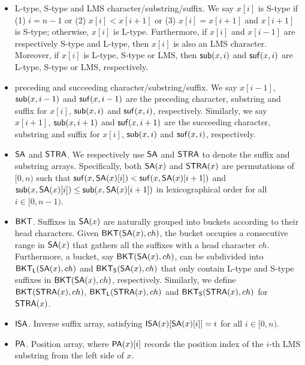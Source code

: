 \documentclass[10pt,journal,compsoc]{IEEEtran}
\begin{document}
\begin{itemize}[itemindent = 0ex]
	\item L-type, S-type and LMS character/substring/suffix. We say $x[i]$ is S-type if (1) $i = n - 1$ or (2) $x[i] < x[i + 1]$ or (3) $x[i] = x[i+1]$ and $x[i+1]$ is S-type; otherwise, $x[i]$ is L-type. Furthermore, if $x[i]$ and $x[i - 1]$ are respectively S-type and L-type, then $x[i]$ is also an LMS character. Moreover, if $x[i]$ is L-type, S-type or LMS, then ${\sf sub}(x,i)$ and ${\sf suf}(x,i)$ are L-type, S-type or LMS, respectively.
	
	\item preceding and succeeding character/substring/suffix. We say $x[i - 1]$, ${\sf sub}(x, i - 1)$ and ${\sf suf}(x, i - 1)$ are the preceding character, substring and suffix for $x[i]$, ${\sf sub}(x, i)$ and ${\sf suf}(x, i)$, respectively. Similarly, we say $x[i + 1]$, ${\sf sub}(x, i + 1)$ and ${\sf suf}(x, i + 1)$ are the succeeding character, substring and suffix for $x[i]$, ${\sf sub}(x, i)$ and ${\sf suf}(x, i)$, respectively.
	
	\item ${\sf SA}$ and ${\sf STRA}$. We respectively use ${\sf SA}$ and ${\sf STRA}$ to denote the suffix and substring arrays. Specifically, both ${\sf SA}(x)$ and ${\sf STRA}(x)$ are permutations of $[0, n)$ such that ${\sf suf}(x, {\sf SA}(x)[i]) < {\sf suf}(x, {\sf SA}(x)[i + 1])$ and ${\sf sub}(x, {\sf SA}(x)[i]) \le {\sf sub}(x, {\sf SA}(x)[i + 1])$ in lexicographical order for all $i \in [0, n - 1)$.
	
	\item ${\sf BKT}$. Suffixes in ${\sf SA}(x)$ are naturally grouped into buckets according to their head characters. Given ${\sf BKT}({\sf SA}(x), ch)$, the bucket occupies a consecutive range in ${\sf SA}(x)$ that gathers all the suffixes with a head character $ch$. Furthermore, a bucket, say ${\sf BKT}({\sf SA}(x), ch)$, can be subdivided into ${\sf BKT_L}({\sf SA}(x), ch)$ and ${\sf BKT_S}({\sf SA}(x), ch)$ that only contain L-type and S-type suffixes in ${\sf BKT}({\sf SA}(x), ch)$, respectively. Similarly, we define ${\sf BKT}({\sf STRA}(x), ch)$, ${\sf BKT_L}({\sf STRA}(x), ch)$ and ${\sf BKT_S}({\sf STRA}(x), ch)$ for ${\sf STRA}(x)$.
	
	\item ${\sf ISA}$. Inverse suffix array, satisfying ${\sf ISA}(x)[{\sf SA}(x)[i]] = i$ for all $i \in [0,n)$.
	
	\item ${\sf PA}$. Position array, where ${\sf PA}(x)[i]$ records the position index of the $i$-th LMS substring from the left side of $x$.
	
	
\end{itemize}
\end{document}
